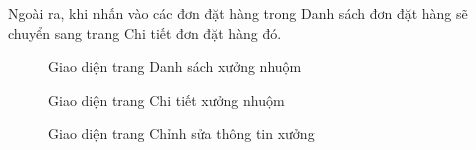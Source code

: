 Ngoài ra, khi nhấn vào các đơn đặt hàng trong Danh sách đơn đặt hàng sẽ chuyển sang trang Chi tiết đơn đặt hàng đó.

\begin{figure}[H]
    \begin{center}
        \caption{Giao diện trang Danh sách xưởng nhuộm}
        \label{result_danh_sach_xuong}
    \end{center}
\end{figure}

\begin{figure}[H]
    \begin{center}
        \caption{Giao diện trang Chi tiết xưởng nhuộm}
        \label{result_chi_tiet_xuong}
    \end{center}
\end{figure}

\begin{figure}[H]
    \begin{center}
        \caption{Giao diện trang Chỉnh sửa thông tin xưởng}
        \label{result_sua_thong_tin_xuong}
    \end{center}
\end{figure}

